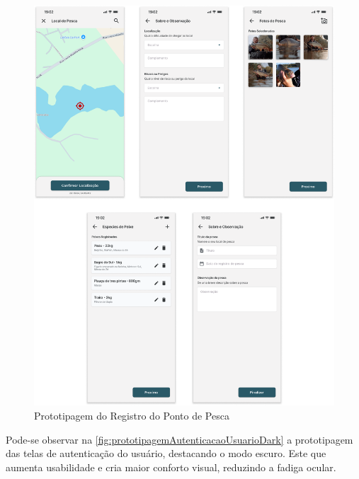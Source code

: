 \begin{figure}[H]
    \centering
    \caption{Prototipagem do Registro do Ponto de Pesca}
    \label{fig:prototipagemRegisterSpot}
    \includegraphics[scale=0.29]{./dados/figuras/prototipagem-spot-register.png}
\end{figure}


Pode-se observar na \autoref{fig:prototipagemAutenticacaoUsuarioDark} a prototipagem das telas de autenticação do usuário, destacando o modo escuro. Este que aumenta  usabilidade e cria maior conforto visual, reduzindo a fadiga ocular.

